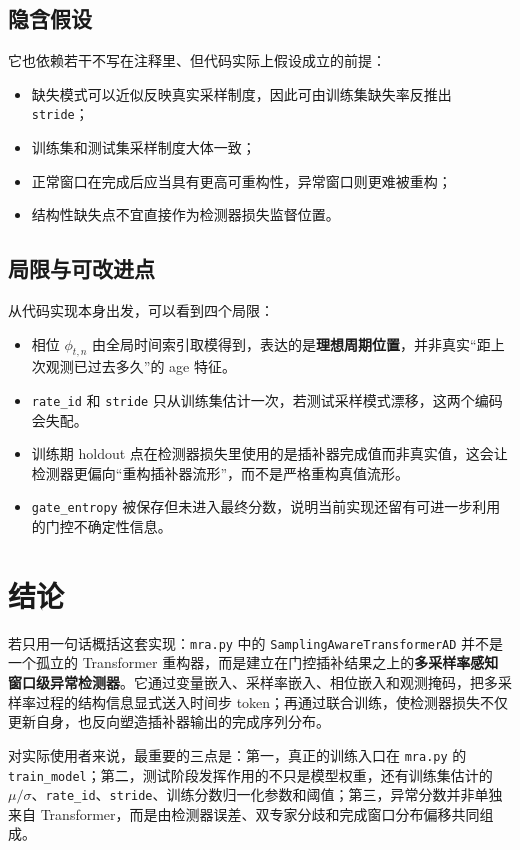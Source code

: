 \documentclass[UTF8]{ctexart}
\begin{document}
\subsection{隐含假设}

它也依赖若干不写在注释里、但代码实际上假设成立的前提：
\begin{itemize}
    \item 缺失模式可以近似反映真实采样制度，因此可由训练集缺失率反推出 \texttt{stride}；
    \item 训练集和测试集采样制度大体一致；
    \item 正常窗口在完成后应当具有更高可重构性，异常窗口则更难被重构；
    \item 结构性缺失点不宜直接作为检测器损失监督位置。
\end{itemize}

\subsection{局限与可改进点}

从代码实现本身出发，可以看到四个局限：
\begin{itemize}
    \item 相位 \(\phi_{t,n}\) 由全局时间索引取模得到，表达的是\textbf{理想周期位置}，并非真实“距上次观测已过去多久”的 age 特征。
    \item \texttt{rate\_id} 和 \texttt{stride} 只从训练集估计一次，若测试采样模式漂移，这两个编码会失配。
    \item 训练期 holdout 点在检测器损失里使用的是插补器完成值而非真实值，这会让检测器更偏向“重构插补器流形”，而不是严格重构真值流形。
    \item \texttt{gate\_entropy} 被保存但未进入最终分数，说明当前实现还留有可进一步利用的门控不确定性信息。
\end{itemize}

\section{结论}

若只用一句话概括这套实现：\texttt{mra.py} 中的 \texttt{SamplingAwareTransformerAD} 并不是一个孤立的 Transformer 重构器，而是建立在门控插补结果之上的\textbf{多采样率感知窗口级异常检测器}。它通过变量嵌入、采样率嵌入、相位嵌入和观测掩码，把多采样率过程的结构信息显式送入时间步 token；再通过联合训练，使检测器损失不仅更新自身，也反向塑造插补器输出的完成序列分布。

对实际使用者来说，最重要的三点是：第一，真正的训练入口在 \texttt{mra.py} 的 \texttt{train\_model}；第二，测试阶段发挥作用的不只是模型权重，还有训练集估计的 \(\mu/\sigma\)、\texttt{rate\_id}、\texttt{stride}、训练分数归一化参数和阈值；第三，异常分数并非单独来自 Transformer，而是由检测器误差、双专家分歧和完成窗口分布偏移共同组成。
\end{document}
